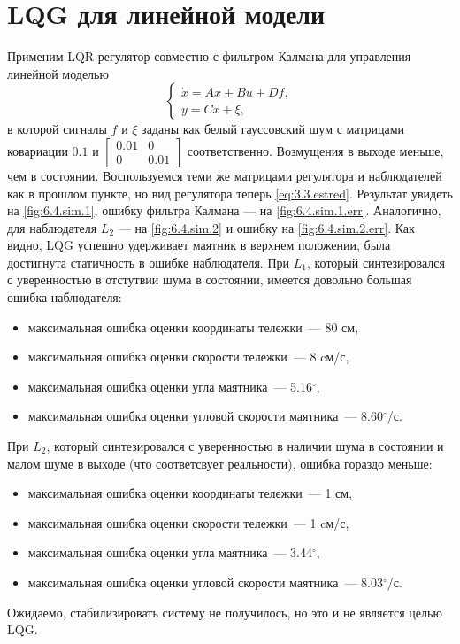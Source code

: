 \section{LQG для линейной модели}

Применим LQR-регулятор совместно с фильтром Калмана для управления 
линейной моделью
\begin{equation}
    \label{eq:sys.noise}
    \begin{cases}
        \dot x=Ax+Bu+Df,\\
        y=Cx+\xi,
    \end{cases}
\end{equation}
в которой сигналы $f$ и $\xi$ заданы как белый гауссовский шум
с матрицами ковариации $0.1$ и $\begin{bmatrix}
    0.01&0\\0&0.01
\end{bmatrix}$ соответственно. Возмущения в выходе меньше, чем в состоянии.
Воспользуемся теми же матрицами регулятора и наблюдателей как в прошлом 
пункте, но вид регулятора теперь \eqref{eq:3.3.estred}. Результат
увидеть на \autoref{fig:6.4.sim.1}, ошибку фильтра Калмана — на 
\autoref{fig:6.4.sim.1.err}. Аналогично, для наблюдателя $L_2$ — 
на \autoref{fig:6.4.sim.2} и ошибку на \autoref{fig:6.4.sim.2.err}. 
Как видно, LQG успешно удерживает маятник в верхнем положении, была
достигнута статичность в ошибке наблюдателя. При $L_1$, который синтезировался
с уверенностью в отстутвии шума в состоянии, имеется довольно большая 
ошибка наблюдателя:
\begin{itemize}
    \item максимальная ошибка оценки координаты тележки~--- 80 см,
    \item максимальная ошибка оценки скорости тележки~--- 8 cм/с,
    \item максимальная ошибка оценки угла маятника~--- 5.16$^\circ$,
    \item максимальная ошибка оценки угловой скорости маятника~--- 8.60$^\circ$/с.
\end{itemize}
При $L_2$, который синтезировался
с уверенностью в наличии шума в состоянии и малом шуме в выходе (что соответсвует реальности), 
ошибка гораздо меньше:
\begin{itemize}
    \item максимальная ошибка оценки координаты тележки~--- 1 см,
    \item максимальная ошибка оценки скорости тележки~--- 1 cм/с,
    \item максимальная ошибка оценки угла маятника~--- 3.44$^\circ$,
    \item максимальная ошибка оценки угловой скорости маятника~--- 8.03$^\circ$/с.
\end{itemize}
Ожидаемо, стабилизировать систему не получилось, но это и не является целью LQG.

